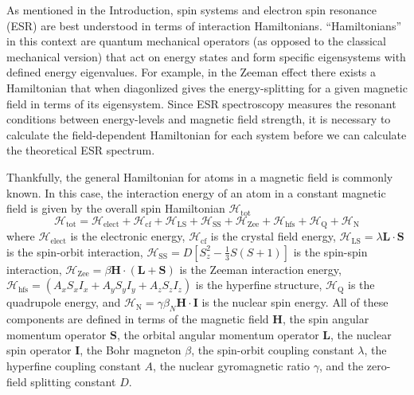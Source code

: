 \documentclass[oneside]{BYUPhys}
\begin{document}
As mentioned in the Introduction, spin systems and electron spin resonance (ESR) are best understood in terms of interaction Hamiltonians. ``Hamiltonians'' in this context are quantum mechanical operators (as opposed to the classical mechanical version) that act on energy states and form specific eigensystems with defined energy eigenvalues. For example, in the Zeeman effect there exists a Hamiltonian that when diagonlized gives the energy-splitting for a given magnetic field in terms of its eigensystem. Since ESR spectroscopy measures the resonant conditions between energy-levels and magnetic field strength, it is necessary to calculate the field-dependent Hamiltonian for each system before we can calculate the theoretical ESR spectrum.

Thankfully, the general Hamiltonian for atoms in a magnetic field is commonly known. In this case, the interaction energy of an atom in a constant magnetic field is given by the overall spin Hamiltonian $\mathcal{H}_{\text{tot}}$ $$\mathcal{H}_{\text{tot}} = \mathcal{H}_{\text{elect}} + \mathcal{H}_{\text{cf}} + \mathcal{H}_{\text{LS}} + \mathcal{H}_{\text{SS}} + \mathcal{H}_{\text{Zee}} + \mathcal{H}_{\text{hfs}} + \mathcal{H}_{\text{Q}} + \mathcal{H}_{\text{N}}$$ where $\mathcal{H}_{\text{elect}}$ is the electronic energy, $\mathcal{H}_{\text{cf}}$ is the crystal field energy, $\mathcal{H}_{\text{LS}} = \lambda \mathbf{L} \cdot \mathbf{S}$ is the spin-orbit interaction, $\mathcal{H}_{\text{SS}} = D \left[ S_{z}^{2} - \frac{1}{3} S (S+1) \right]$ is the spin-spin interaction, $\mathcal{H}_{\text{Zee}} = \beta \mathbf{H} \cdot (\mathbf{L}+\mathbf{S})$ is the Zeeman interaction energy, $\mathcal{H}_{\text{hfs}} = \left(A_xS_xI_x + A_yS_yI_y + A_zS_zI_z\right)$ is the hyperfine structure, $\mathcal{H}_{\text{Q}}$ is the quadrupole energy, and $\mathcal{H}_{\text{N}} = \gamma \beta_{N} \mathbf{H} \cdot \mathbf{I}$ is the nuclear spin energy. All of these components are defined in terms of the magnetic field $\mathbf{H}$, the spin angular momentum operator $\mathbf{S}$, the orbital angular momentum operator $\mathbf{L}$, the nuclear spin operator $\mathbf{I}$, the Bohr magneton $\beta$, the spin-orbit coupling constant $\lambda$, the hyperfine coupling constant $A$, the nuclear gyromagnetic ratio $\gamma$, and the zero-field splitting constant $D$.
\end{document}
